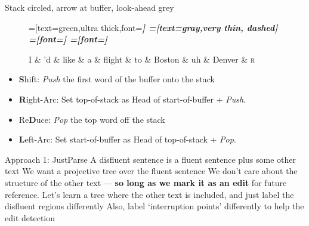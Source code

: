 \documentclass{lecture}
\begin{document}
\begin{plain}{Stack circled, arrow at buffer, look-ahead grey}
\begin{figure}
    \centering
    \begin{dependency}[theme=simple]
    =[text=green,ultra thick,font=\bfseries\itshape]
    =[text=gray,very thin, dashed]
    =[font=\bfseries\itshape]
    =[font=\itshape]
    \begin{deptext}[column sep=.075cm, row sep=.1ex]
        I \& 'd \& like \& a \& flight \& to \& Boston \& uh \& Denver \&  \textsc{r} \\
    \end{deptext}
\end{dependency}
\end{figure}
    \begin{itemize}
        \item \textbf{S}hift: \emph{Push} the first word of the buffer onto the stack
    \item \textbf{R}ight-Arc: Set top-of-stack as Head of start-of-buffer + \emph{Push}.
    \item Re\textbf{D}uce: \emph{Pop} the top word off the stack
    \item \textbf{L}eft-Arc: Set start-of-buffer as Head of top-of-stack + \emph{Pop}.
    \end{itemize}
\end{plain}


\begin{points}{Approach 1: JustParse}
    \p A disfluent sentence is a fluent sentence plus some other text
    \p We want a projective tree over the fluent sentence
    \p We don't care about the structure of the other text --- \textbf{so long as we mark it
    as an edit} for future reference.
    \p Let's learn a tree where the other text is included, and just label the
       disfluent regions differently
    \p Also, label `interruption points' differently to help the edit detection
\end{points}
\end{document}

